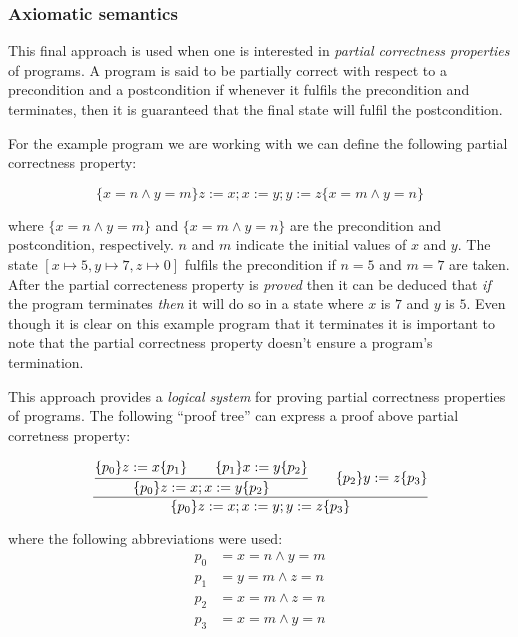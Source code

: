 \subsubsection{Axiomatic semantics}

This final approach is used when one is interested in \textit{partial correctness properties} of programs.
A program is said to be partially correct with respect to a precondition and a postcondition if whenever it fulfils the precondition and terminates, then it is guaranteed that the final state will fulfil the postcondition.

For the example program we are working with we can define the following partial correctness property:

\begin{equation*}
\lbrace x=n \land y=m \rbrace z:=x; x:=y; y:=z \lbrace x=m \land y=n \rbrace
\end{equation*}

where $\lbrace x=n \land y=m \rbrace $ and $\lbrace x=m \land y=n \rbrace $ are the precondition and postcondition, respectively.
$n$ and $m$ indicate the initial values of $x$ and $y$.
The state $[x\mapsto5, y\mapsto7, z\mapsto0]$ fulfils the precondition if $n=5$ and $m=7$ are taken.
After the partial correcteness property is \textit{proved} then it can be deduced that \textit{if} the program terminates \textit{then} it will do so in a state where $x$ is $7$ and $y$ is $5$.
Even though it is clear on this example program that it terminates it is important to note that the partial correctness property doesn't ensure a program's termination.

This approach provides a \textit{logical system} for proving partial correctness properties of programs.
The following ``proof tree'' can express a proof above partial corretness property:

\begin{equation*}
\cfrac{
  \cfrac{ \lbrace p_{0} \rbrace z:=x \lbrace p_{1} \rbrace \qquad \lbrace p_{1} \rbrace x:=y \lbrace p_{2} \rbrace }
    { \lbrace p_{0} \rbrace z:=x; x:=y \lbrace p_{2} \rbrace }
  \qquad
 \lbrace p_{2} \rbrace y:=z \lbrace p_{3} \rbrace
  }
  { \lbrace p_{0} \rbrace z:=x; x:=y; y:=z \lbrace p_{3} \rbrace }
\end{equation*}

where the following abbreviations were used:
\begin{align*}
p_{0} &= x=n \land y=m\\
p_{1} &= y=m \land z=n\\
p_{2} &= x=m \land z=n\\
p_{3} &= x=m \land y=n
\end{align*}

